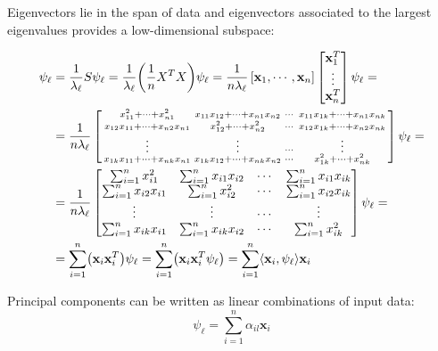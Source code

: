 \documentclass[12pt, letterpaper]{article}
\theoremstyle{definition}
\newcommand{\x}{\mathbf{x}}
\DeclarePairedDelimiter\autobracket{(}{)}
\newcommand{\br}[1]{\autobracket*{#1}}
\begin{document}
Eigenvectors lie in the span of data and eigenvectors associated to the largest eigenvalues provides a low-dimensional subspace:

\begin{equation}
\begin{aligned}
\psi_\ell  &= \frac{1}{\lambda_\ell} S \psi_\ell = \frac{1}{\lambda_\ell} \br{\frac{1}{n}X^TX} \psi_\ell = \frac{1}{n\lambda_\ell} \left[\x_1, \cdots, \x_n \right] \begin{bmatrix} \x_1^T \\ \vdots\\ \x_n^T\end{bmatrix} \psi_\ell = \\
&= \frac{1}{n\lambda_\ell} \left[\begin{smallmatrix}
	x_{11}^2 +\cdots  +x_{n1}^2             & x_{11}x_{12}+\cdots +x_{n1}x_{n2}& \cdots &x_{11}x_{1k}+\cdots +x_{n1}x_{nk}\\
	x_{12} x_{11} +\cdots + x_{n2}x_{n1} & x_{12}^2+\cdots +x_{n2}^2          &\cdots &x_{12}x_{1k}+\cdots +x_{n2}x_{nk}\\
	\vdots&\vdots&\cdots &\vdots \\
	x_{1k} x_{11} +\cdots + x_{nk}x_{n1} & x_{1k}x_{12} +\cdots +x_{nk}x_{n2}  &\cdots &x_{1k}^2+\cdots +x_{nk}^2
\end{smallmatrix}\right]\psi_\ell =\\
&= \frac{1}{n\lambda_\ell} \begin{bmatrix}
\sum_{i=1}^n x_{i1}^2     &\sum_{i=1}^n x_{i1}x_{i2}& \cdots &\sum_{i=1}^n x_{i1}x_{ik}\\
\sum_{i=1}^nx_{i2} x_{i1} & \sum_{i=1}^n x_{i2}^2          &\cdots &\sum_{i=1}^n x_{i2}x_{ik}\\
\vdots&\vdots&\cdots &\vdots \\
\sum_{i=1}^n x_{ik} x_{i1}  & \sum_{i=1}^n x_{ik}x_{i2}         &\cdots &\sum_{i=1}^n x_{ik}^2
\end{bmatrix}\psi_\ell = \\
&=\sum_{i=1}^n \br{\x_i \x_i^T}\psi_\ell = \sum_{i=1}^n \br{\x_i \x_i^T\psi_\ell} = \sum_{i=1}^n \langle \x_i,\psi_\ell\rangle\x_i
\end{aligned}
\end{equation}

Principal components can be written as linear combinations of input data:
\begin{equation}
\label{PCALinComb}
\psi_\ell = \sum_{i=1}^n \alpha_{il} \x_i
\end{equation}
\end{document}
